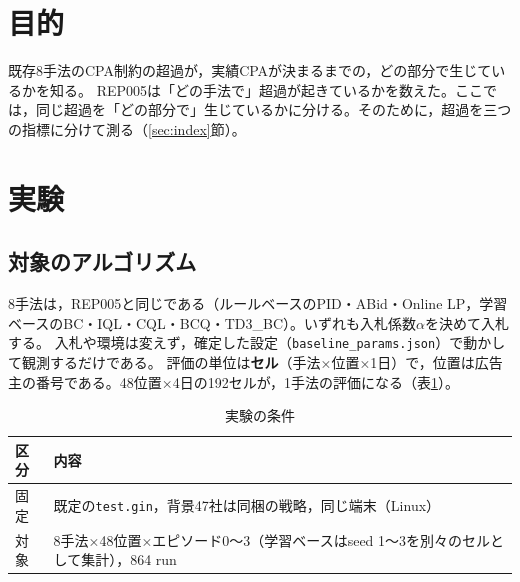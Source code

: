 \documentclass[twocolumn, 10pt]{ujarticle}
\begin{document}
\beginverification

\section{目的}\label{sec:e-purpose}

既存8手法のCPA制約の超過が，実績CPAが決まるまでの，どの部分で生じているかを知る。
REP005は「どの手法で」超過が起きているかを数えた。ここでは，同じ超過を「どの部分で」生じているかに分ける。そのために，超過を三つの指標に分けて測る（\ref{sec:index}節）。

\section{実験}\label{sec:e-exp}

\subsection{対象のアルゴリズム}\label{sec:e-algo}

8手法は，REP005と同じである（ルールベースのPID・ABid・Online LP，学習ベースのBC・IQL・CQL・BCQ・TD3\_BC）。いずれも入札係数$\alpha$を決めて入札する。
入札や環境は変えず，確定した設定（\texttt{baseline\_params.json}）で動かして観測するだけである。
評価の単位は\textbf{セル}（手法×位置×1日）で，位置は広告主の番号である。48位置×4日の192セルが，1手法の評価になる（表\ref{tab:env}）。

\begin{table}[H]
\centering
\caption{実験の条件}
\label{tab:env}
\small
\begin{tabularx}{\linewidth}{@{}l>{\raggedright\arraybackslash}X@{}}
\toprule
区分 & 内容 \\
\midrule
固定 & 既定の\texttt{test.gin}，背景47社は同梱の戦略，同じ端末（Linux） \\
対象 & 8手法×48位置×エピソード0〜3（学習ベースはseed 1〜3を別々のセルとして集計），864 run \\
\bottomrule
\end{tabularx}
\end{table}
\end{document}
